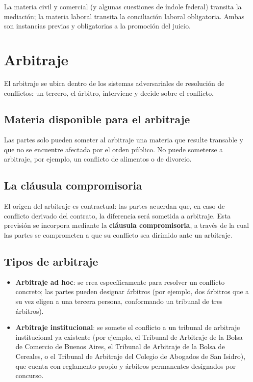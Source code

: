 \documentclass[12pt,oneside]{book}
\begin{document}
\begin{note}
La materia civil y comercial (y algunas cuestiones de índole federal) transita la mediación; la materia laboral transita la conciliación laboral obligatoria. Ambas son instancias previas y obligatorias a la promoción del juicio.
\end{note}

\section{Arbitraje}

El arbitraje se ubica dentro de los sistemas adversariales de resolución de conflictos: un tercero, el árbitro, interviene y decide sobre el conflicto.

\subsection{Materia disponible para el arbitraje}

Las partes solo pueden someter al arbitraje una materia que resulte transable y que no se encuentre afectada por el orden público. No puede someterse a arbitraje, por ejemplo, un conflicto de alimentos o de divorcio.

\subsection{La cláusula compromisoria}

El origen del arbitraje es contractual: las partes acuerdan que, en caso de conflicto derivado del contrato, la diferencia será sometida a arbitraje. Esta previsión se incorpora mediante la \textbf{cláusula compromisoria}, a través de la cual las partes se comprometen a que su conflicto sea dirimido ante un arbitraje.

\subsection{Tipos de arbitraje}

\begin{itemize}
    \item \textbf{Arbitraje ad hoc}: se crea específicamente para resolver un conflicto concreto; las partes pueden designar árbitros (por ejemplo, dos árbitros que a su vez eligen a una tercera persona, conformando un tribunal de tres árbitros).
    \item \textbf{Arbitraje institucional}: se somete el conflicto a un tribunal de arbitraje institucional ya existente (por ejemplo, el Tribunal de Arbitraje de la Bolsa de Comercio de Buenos Aires, el Tribunal de Arbitraje de la Bolsa de Cereales, o el Tribunal de Arbitraje del Colegio de Abogados de San Isidro), que cuenta con reglamento propio y árbitros permanentes designados por concurso.
\end{itemize}
\end{document}
